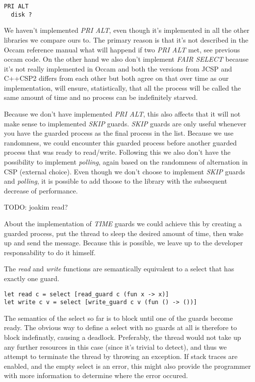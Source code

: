 \documentclass[a4paper,12pt]{article}
\begin{document}
\begin{verbatim}
PRI ALT
  disk ?
\end{verbatim}

We haven't implemented {\it PRI ALT}\cite{occam}, even though it's implemented
in all the other libraries we compare ours to. The primary reason is that it's
not described in the Occam reference manual what will happend if two {\it PRI
ALT} met, see previous occam code. On the other hand we also don't implement
{\it FAIR SELECT} because it's not really implemented in Occam and both the
versions from JCSP and C++CSP2 differs from each other but both agree on that
over time as our implementation, will ensure, statistically, that all the
process will be called the same amount of time and no process can be
indefinitely starved.

Because we don't have implemented {\it PRI ALT}, this also affects that it will
not make sense to implemented {\it SKIP} guards. {\it SKIP} guards are only
useful whenever you have the guarded process as the final process in the list.
Because we use randomness, we could encounter this guarded process before
another guarded process that was ready to read/write. Following this we also
don't have the possibility to implement {\it polling}, again based on the
randomness of alternation in CSP (external choice). Even though we don't choose
to implement {\it SKIP} guards and {\it polling}, it is possible to add thoose
to the library with the subsequent decrease of performance.

TODO: joakim read?

About the implementation of {\it TIME} guards we could achieve this by creating
a guarded process, put the thread to sleep the desired amount of time, then wake
up and send the message. Because this is possible, we leave up to the developer
responsability to do it himself.

The \emph{read} and \emph{write} functions are semantically equivalent to a select that has exactly 
one guard.

\begin{verbatim}
let read c = select [read_guard c (fun x -> x)]
let write c v = select [write_guard c v (fun () -> ())]
\end{verbatim}

The semantics of the select so far is to block until one of the guards become ready. The obvious
way to define a select with no guards at all is therefore to block indefinatly, causing a deadlock.
Preferably, the thread would not take up any further resources in this case (since it's trivial to 
detect), and thus we attempt to terminate the thread by throwing an exception. If stack traces are
enabled, and the empty select is an error, this might also provide the programmer with more information
to determine where the error occured.
\end{document}
